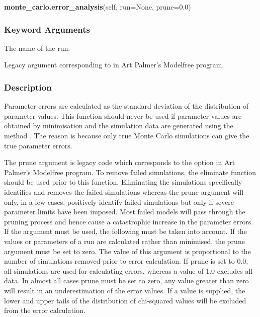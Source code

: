 \textsf{\textbf{monte\_carlo.error\_analysis}(self, run=None, prune=0.0)}


\subsubsection{Keyword Arguments}

  The name of the run. 

  Legacy argument corresponding to  in Art Palmer's Modelfree program. 




\subsubsection{Description}

Parameter errors are calculated as the standard deviation of the distribution of parameter values.  This function should never be used if parameter values are obtained by minimisation and the simulation data are generated using the method .  The reason is because only true Monte Carlo simulations can give the true parameter errors.


The prune argument is legacy code which corresponds to the  option in Art Palmer's Modelfree program.  To remove failed simulations, the eliminate function should be used prior to this function.  Eliminating the simulations specifically identifies and removes the failed simulations whereas the prune argument will only, in a few cases, positively identify failed simulations but only if severe parameter limits have been imposed.  Most failed models will pass through the pruning process and hence cause a catastrophic increase in the parameter errors.  If the argument must be used, the following must be taken into account. If the values or parameters of a run are calculated rather than minimised, the prune argument must be set to zero.  The value of this argument is proportional to the number of simulations removed prior to error calculation.  If prune is set to 0.0, all simulations are used for calculating errors, whereas a value of 1.0 excludes all data.  In almost all cases prune must be set to zero, any value greater than zero will result in an underestimation of the error values.  If a value is supplied, the lower and upper tails of the distribution of chi-squared values will be excluded from the error calculation.




